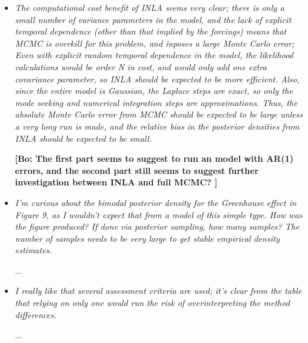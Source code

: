 \documentclass[11pt]{article}
\newcommand{\bl}[1]{\color{red}\textbf{[Bo: #1]}\normalcolor}
\begin{document}
\begin{itemize}
\item \textit{The computational cost benefit of INLA seems very clear; there is
  only a small number of variance parameters in the model, and the
  lack of explicit temporal dependence (other than that implied by the
  forcings) means that MCMC is overkill for this problem, and inposes
  a large Monte Carlo error; Even with explicit random temporal
  dependence in the model, the likelihood calculations would be order
  N in cost, and would only add one extra covariance parameter, so
  INLA should be expected to be more efficient.  Also, since the
  entire model is Gaussian, the Laplace steps are exact, so only the
  mode seeking and numerical integration steps are approximations.
  Thus, the absolute Monte Carlo error from MCMC should be expected to
  be large unless a very long run is made, and the relative bias in
  the posterior densities from INLA should be expected to be small.}

\bl{The first part seems to suggest to run an model with AR(1) errors, and the second part still seems to suggest further investigation between INLA and full MCMC? }

\item \textit{I'm curious about the bimodal posterior density for the Greenhouse
  effect in Figure 9, as I wouldn't expect that from a model of this
  simple type.  How was the figure produced? If done via posterior
  sampling, how many samples? The number of samples needs to be very
  large to get stable empirical density estimates.}

...

\item \textit{I really like that several assessment criteria are used; it's clear
  from the table that relying on only one would run the risk of
  overinterpreting the method differences.}

...

\end{itemize}
\end{document}
